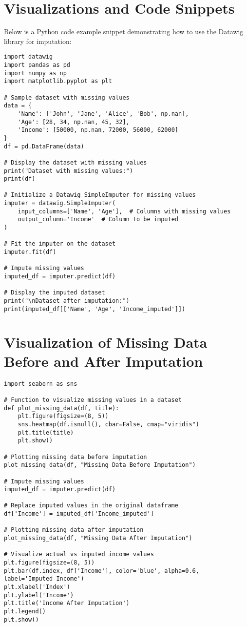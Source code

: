 \documentclass{article}
\begin{document}
\section{Visualizations and Code Snippets}
Below is a Python code example snippet demonstrating how to use the Datawig library for imputation:

\begin{lstlisting}
import datawig
import pandas as pd
import numpy as np
import matplotlib.pyplot as plt

# Sample dataset with missing values
data = {
    'Name': ['John', 'Jane', 'Alice', 'Bob', np.nan],
    'Age': [28, 34, np.nan, 45, 32],
    'Income': [50000, np.nan, 72000, 56000, 62000]
}
df = pd.DataFrame(data)

# Display the dataset with missing values
print("Dataset with missing values:")
print(df)

# Initialize a Datawig SimpleImputer for missing values
imputer = datawig.SimpleImputer(
    input_columns=['Name', 'Age'],  # Columns with missing values
    output_column='Income'  # Column to be imputed
)

# Fit the imputer on the dataset
imputer.fit(df)

# Impute missing values
imputed_df = imputer.predict(df)

# Display the imputed dataset
print("\nDataset after imputation:")
print(imputed_df[['Name', 'Age', 'Income_imputed']])
\end{lstlisting}
\pagebreak
\section*{Visualization of Missing Data Before and After Imputation}

\begin{lstlisting}
import seaborn as sns

# Function to visualize missing values in a dataset
def plot_missing_data(df, title):
    plt.figure(figsize=(8, 5))
    sns.heatmap(df.isnull(), cbar=False, cmap="viridis")
    plt.title(title)
    plt.show()

# Plotting missing data before imputation
plot_missing_data(df, "Missing Data Before Imputation")

# Impute missing values
imputed_df = imputer.predict(df)

# Replace imputed values in the original dataframe
df['Income'] = imputed_df['Income_imputed']

# Plotting missing data after imputation
plot_missing_data(df, "Missing Data After Imputation")

# Visualize actual vs imputed income values
plt.figure(figsize=(8, 5))
plt.bar(df.index, df['Income'], color='blue', alpha=0.6, label='Imputed Income')
plt.xlabel('Index')
plt.ylabel('Income')
plt.title('Income After Imputation')
plt.legend()
plt.show()
\end{lstlisting}
\end{document}
